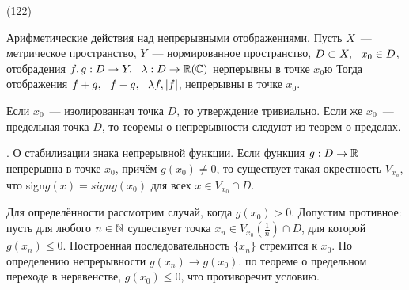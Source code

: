 (122)

\T \q Арифметические действия над непрерывными отображениями. Пусть $X$~--- метрическое пространство, $Y$~--- нормированное пространство, $D\subset X,\ \  x_0 \in D$, отобрадения $f, g: D \to Y,\ \  \lambda: D \to \mathbb{R}(\mathbb{C})$ нерперывны в  точке $x_0$ю Тогда отображения $f + g,\ \  f - g,\ \  \lambda f, |f|$, непрерывны в точке $x_0$.

\D Если $x_0$~--- изолированнач точка $D$, то утверждение тривиально. Если же $x_0$~--- предельная точка $D$, то теоремы о непрерывности следуют из теорем о пределах.

. \q О стабилизации знака непрерывной функции. Если функция $g: D\to \mathbb{R}$ непрерывна в точке $x_0$, причём $g(x_0) \neq 0$, то существует такая окрестность $V_{x_a}$, что sign$g(x) = \textit{sign}g(x_0)$ для всех $x \in V_{x_0} \cap D$.

\D Для определённости рассмотрим случай, когда $g(x_0) > 0$. Допустим противное: пусть для любого $n \in \mathbb{N}$ существует точка $x_n \in V_{x_0}(\frac 1n) \cap D$, для которой $g(x_n) \le 0$. Построенная последовательность $\{x_n\}$ стремится к $x_0$. По определению непрерывности $g(x_n) \to g(x_0)$. по теореме о предельном переходе в неравенстве, $g(x_0) \le 0$, что противоречит условию.